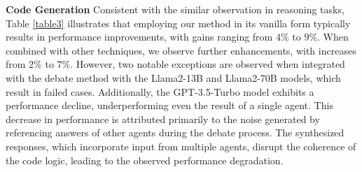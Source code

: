 \textbf{Code Generation} Consistent with the similar observation in reasoning tasks, Table \ref{table3} illustrates that employing our method in its vanilla form typically results in performance improvements, with gains ranging from $4\%$ to $9\%$. When combined with other techniques, we observe further enhancements, with increases from $2\%$ to $7\%$. However, two notable exceptions are observed when integrated with the debate method with the Llama2-13B and Llama2-70B models, which result in failed cases. Additionally, the GPT-3.5-Turbo model exhibits a performance decline, underperforming even the result of a single agent. This decrease in performance is attributed primarily to the noise generated by referencing answers of other agents during the debate process. The synthesized responses, which incorporate input from multiple agents, disrupt the coherence of the code logic, leading to the observed performance degradation.


